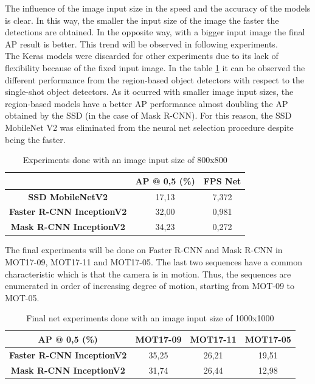The influence of the image input size in the speed and the accuracy of the models is clear. In this way, the smaller the input size of the image the faster the detections are obtained. In the opposite way, with a bigger input image the final AP result is better. This trend will be observed in following experiments.\\

The Keras models were discarded for other experiments due to its lack of flexibility because of the fixed input image. In the table \ref{tab:net_exp_3}  it can be observed the different performance from the region-based object detectors with respect to the single-shot object detectors. As it ocurred with smaller image input sizes, the region-based models have a better AP performance almost doubling the AP obtained by the SSD (in the case of Mask R-CNN). For this reason, the SSD MobileNet V2 was eliminated from the neural net selection procedure despite being the faster. 
\begin{table}[H]
\scriptsize
\begin{center}
\begin{tabular}{|c|c|c|}
\hline
\textbf{}                         & \textbf{AP @ 0,5 (\%)} & \textbf{FPS Net} \\ \hline
\textbf{SSD MobileNetV2}          & 17,13                  & 7,372             \\ \hline
\textbf{Faster R-CNN InceptionV2} & 32,00                  & 0,981            \\ \hline
\textbf{Mask R-CNN InceptionV2}   & 34,23                  & 0,272            \\ \hline
\end{tabular}
\end{center}
\caption{Experiments done with an image input size of 800x800}
\label{tab:net_exp_3}
\end{table}
The final experiments will be done on Faster R-CNN and Mask R-CNN in MOT17-09, MOT17-11 and MOT17-05. The last two sequences have a common characteristic which is that the camera is in motion. Thus, the sequences are enumerated in order of increasing degree of motion, starting from MOT-09 to MOT-05.
\begin{table}[H]
\scriptsize
\begin{center}
\begin{tabular}{|c|c|c|c|}
\hline
\textbf{AP @ 0,5 (\%)}            & \textbf{MOT17-09} & \textbf{MOT17-11} & \multicolumn{1}{l|}{\textbf{MOT17-05}} \\ \hline
\textbf{Faster R-CNN InceptionV2} & 35,25             & 26,21             & 19,51                                  \\ \hline
\textbf{Mask R-CNN InceptionV2}   & 31,74             & 26,44             & 12,98                                  \\ \hline
\end{tabular}
\end{center}
\caption{Final net experiments done with an image input size of 1000x1000}
\label{tab:net_exp_4}
\end{table}
